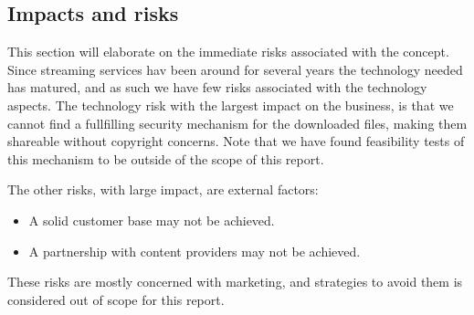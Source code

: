 \subsection{Impacts and risks}
This section will elaborate on the immediate risks associated with the concept. Since
streaming services hav been around for several years the technology needed has matured,
and as such we have few risks associated with the technology aspects. The technology
risk with the largest impact on the business, is that we cannot find a fullfilling
security mechanism for the downloaded files, making them shareable without copyright concerns. Note that
we have found feasibility tests of this mechanism to be outside of the scope of this
report.

The other risks, with large impact, are external factors:
\begin{itemize}
\item A solid customer base may not be achieved.
\item A partnership with content providers may not be achieved.
\end{itemize}

These risks are mostly concerned with marketing, and strategies to avoid them is considered out of scope for this report.
